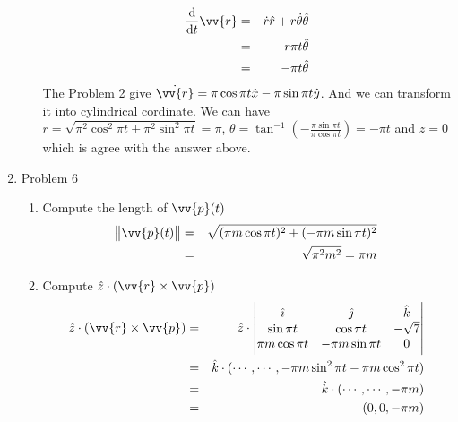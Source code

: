 \documentclass[aps,prl,reprint]{revtex4-1}
\newcommand{\de}{\mathrm{d}}
\begin{document}
\begin{enumerate}
\begin{enumerate}
\begin{eqnarray*}
\frac{\de}{\de t}\vv{r} &=& \dot{r}\hat{r} + r \dot{\theta}\hat{\theta} \\
&=& -r\pi t \hat{\theta}\\
&=& -\pi t \hat{\theta}
\end{eqnarray*}
The Problem 2 give $\dot{\vv{r}} = \pi \cos\pi t \hat{x} - \pi \sin \pi t \hat{y}$. And we can transform it into cylindrical cordinate. 
We can have 
 $r = \sqrt{\pi^2 \cos^2\pi t + \pi^2 \sin^2 \pi t} = \pi$, 
 $\theta = \tan^{-1}(-\frac{\pi \sin \pi t}{\pi \cos \pi t}) = -\pi t$ and $z = 0$ which is agree with the answer above.
\end{enumerate}
\item Problem 6
\begin{enumerate}
\item Compute the length of $\vv{p}(t)$
\begin{eqnarray*}
\norm{\vv{p}(t)} &=& \sqrt{(\pi m \cos\pi t)^2+ (-\pi m \sin\pi t)^2}\\
&=& \sqrt{\pi^2m^2} = \pi m 
\end{eqnarray*}
\item Compute $\hat{z}\cdot(\vv{r}\times\vv{p})$
\begin{eqnarray*}
\hat{z}\cdot(\vv{r}\times\vv{p}) &=& \hat{z}\cdot
        \begin{vmatrix}
            \hat{\imath} & \hat{\jmath} & \hat{k} \\
            \sin\pi t & \cos\pi t & - \sqrt{7} \\
            \pi m \cos\pi t & -\pi m \sin\pi t & 0
    \end{vmatrix} \\
&=& \hat{k} \cdot (\cdots, \cdots, -\pi m \sin^2\pi t-\pi m \cos^2 \pi t)\\
&=& \hat{k} \cdot (\cdots, \cdots, -\pi m)\\
&=& (0,0,-\pi m) 
\end{eqnarray*}
\end{enumerate}
\end{enumerate}
\end{document}
